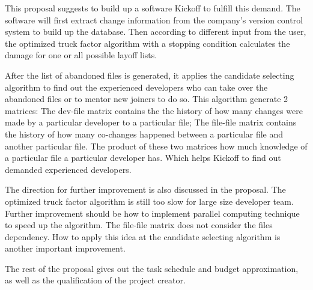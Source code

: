 \documentclass[12pt, a4paper, openright]{report}
\begin{document}
This proposal suggests to build up a software Kickoff to fulfill this demand. The software will first extract change information from the company's version control system to build up the database. Then according to different input from the user, the optimized truck factor algorithm with a stopping condition calculates the damage for one or all possible layoff lists. 

After the list of abandoned files is generated, it applies the candidate selecting algorithm to find out the experienced developers who can take over the abandoned files or to mentor new joiners to do so. This algorithm generate 2 matrices: The dev-file matrix contains the the history of how many changes were made by a particular developer to a particular file; The file-file matrix contains the history of how many co-changes happened between a particular file and another particular file. The product of these two matrices how much knowledge of a particular file a particular developer has. Which helps Kickoff to find out demanded experienced developers.

The direction for further improvement is also discussed in the proposal. The optimized truck factor algorithm is still too slow for large size developer team. Further improvement should be how to implement parallel computing technique to speed up the algorithm. The file-file matrix does not consider the files dependency. How to apply this idea at the candidate selecting algorithm is another important improvement.

The rest of the proposal gives out the task schedule and budget approximation, as well as the qualification of the project creator.



\mainmatter



\chapter*{}
\end{document}
